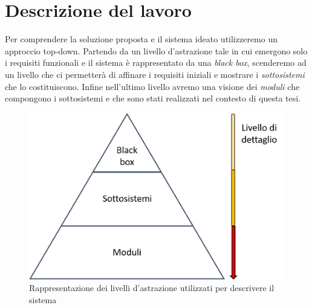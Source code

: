 \chapter{Descrizione del lavoro}
\label{scenario}
Per comprendere la soluzione proposta e il sistema ideato utilizzeremo un approccio top-down. Partendo da un livello d'astrazione tale in cui emergono solo i requisiti funzionali e il sistema è rappresentato da una \textit{black box}, scenderemo ad un livello che ci permetterà di affinare i requisiti iniziali e mostrare i \textit{sottosistemi} che lo costituiscono. Infine nell'ultimo livello avremo una visione dei \textit{moduli} che compongono i sottosistemi e che sono stati realizzati nel contesto di questa tesi.
\begin{figure}[H]
	\centering
	\includegraphics[scale=0.4]{DescrizioneDelSistema/livelli_astrazione.png}
	\caption{Rappresentazione dei livelli d'astrazione utilizzati per descrivere il sistema }
	\label{fig:livelliAstrazione}
\end{figure}
\newpage

